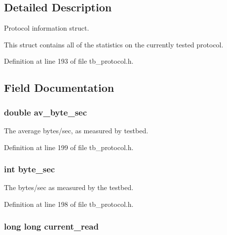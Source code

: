 \subsection{Detailed Description}
Protocol information struct. 

This struct contains all of the statistics on the currently tested protocol. 

Definition at line 193 of file tb\-\_\-protocol.\-h.



\subsection{Field Documentation}
\hypertarget{structtb__prot__stats__t_afcb119a75ab6e472c10bac8ccb627517}{
\subsubsection[{av\-\_\-byte\-\_\-sec}]{\setlength{\rightskip}{0pt plus 5cm}double av\-\_\-byte\-\_\-sec}}\label{structtb__prot__stats__t_afcb119a75ab6e472c10bac8ccb627517}


The average bytes/sec, as measured by testbed. 



Definition at line 199 of file tb\-\_\-protocol.\-h.

\hypertarget{structtb__prot__stats__t_a69f2a2630fbc05fb4fd41fb24459e9c6}{
\subsubsection[{byte\-\_\-sec}]{\setlength{\rightskip}{0pt plus 5cm}int byte\-\_\-sec}}\label{structtb__prot__stats__t_a69f2a2630fbc05fb4fd41fb24459e9c6}


The bytes/sec as measured by the testbed. 



Definition at line 198 of file tb\-\_\-protocol.\-h.

\hypertarget{structtb__prot__stats__t_a0f29a560900feea0bfd7b1c97e206313}{
\subsubsection[{current\-\_\-read}]{\setlength{\rightskip}{0pt plus 5cm}long long current\-\_\-read}}\label{structtb__prot__stats__t_a0f29a560900feea0bfd7b1c97e206313}



